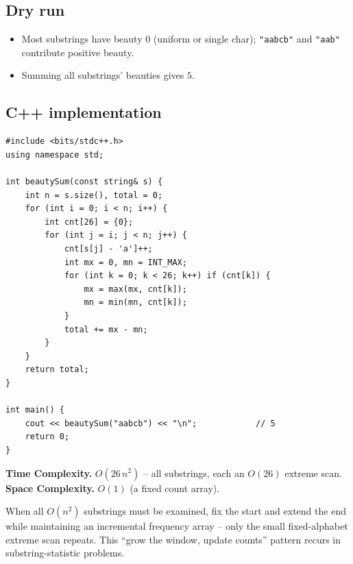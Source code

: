 \subsection*{Dry run}


\begin{itemize}
  \item Most substrings have beauty $0$ (uniform or single char);
        \texttt{"aabcb"} and \texttt{"aab"} contribute positive beauty.
  \item Summing all substrings' beauties gives $5$.
\end{itemize}

\subsection*{C++ implementation}

\begin{lstlisting}
#include <bits/stdc++.h>
using namespace std;

int beautySum(const string& s) {
    int n = s.size(), total = 0;
    for (int i = 0; i < n; i++) {
        int cnt[26] = {0};
        for (int j = i; j < n; j++) {
            cnt[s[j] - 'a']++;
            int mx = 0, mn = INT_MAX;
            for (int k = 0; k < 26; k++) if (cnt[k]) {
                mx = max(mx, cnt[k]);
                mn = min(mn, cnt[k]);
            }
            total += mx - mn;
        }
    }
    return total;
}

int main() {
    cout << beautySum("aabcb") << "\n";            // 5
    return 0;
}
\end{lstlisting}

\begin{complexitybox}
\textbf{Time Complexity.} $O(26\,n^2)$ -- all substrings, each an $O(26)$
extreme scan. \textbf{Space Complexity.} $O(1)$ (a fixed count array).
\end{complexitybox}

\begin{takeawaybox}
When all $O(n^2)$ substrings must be examined, fix the start and extend the
end while maintaining an incremental frequency array -- only the small
fixed-alphabet extreme scan repeats. This ``grow the window, update counts''
pattern recurs in substring-statistic problems.
\end{takeawaybox}
